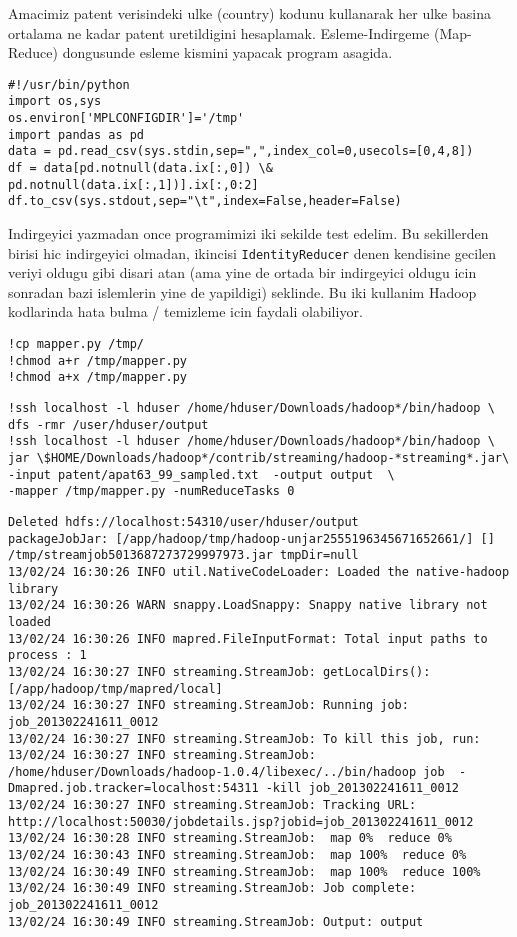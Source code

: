 \documentclass[12pt,fleqn]{article}\usepackage{../common}
\begin{document}
Amacimiz patent verisindeki ulke (country) kodunu kullanarak her ulke
basina ortalama ne kadar patent uretildigini
hesaplamak. Esleme-Indirgeme (Map-Reduce) dongusunde esleme kismini
yapacak program asagida.

\begin{verbatim}
#!/usr/bin/python
import os,sys
os.environ['MPLCONFIGDIR']='/tmp' 
import pandas as pd
data = pd.read_csv(sys.stdin,sep=",",index_col=0,usecols=[0,4,8])
df = data[pd.notnull(data.ix[:,0]) \& pd.notnull(data.ix[:,1])].ix[:,0:2]
df.to_csv(sys.stdout,sep="\t",index=False,header=False)
\end{verbatim}

Indirgeyici yazmadan once programimizi iki sekilde test edelim. Bu
sekillerden birisi hic indirgeyici olmadan, ikincisi
\verb!IdentityReducer! denen kendisine gecilen veriyi oldugu
gibi disari atan (ama yine de ortada bir indirgeyici oldugu icin
sonradan bazi islemlerin yine de yapildigi) seklinde. Bu iki kullanim
Hadoop kodlarinda hata bulma / temizleme icin faydali olabiliyor.

\begin{verbatim}
!cp mapper.py /tmp/
!chmod a+r /tmp/mapper.py
!chmod a+x /tmp/mapper.py
\end{verbatim}

\begin{verbatim}
!ssh localhost -l hduser /home/hduser/Downloads/hadoop*/bin/hadoop \
dfs -rmr /user/hduser/output
!ssh localhost -l hduser /home/hduser/Downloads/hadoop*/bin/hadoop \
jar \$HOME/Downloads/hadoop*/contrib/streaming/hadoop-*streaming*.jar\
-input patent/apat63_99_sampled.txt  -output output  \
-mapper /tmp/mapper.py -numReduceTasks 0 
\end{verbatim}

\begin{verbatim}
Deleted hdfs://localhost:54310/user/hduser/output
packageJobJar: [/app/hadoop/tmp/hadoop-unjar2555196345671652661/] [] /tmp/streamjob5013687273729997973.jar tmpDir=null
13/02/24 16:30:26 INFO util.NativeCodeLoader: Loaded the native-hadoop library
13/02/24 16:30:26 WARN snappy.LoadSnappy: Snappy native library not loaded
13/02/24 16:30:26 INFO mapred.FileInputFormat: Total input paths to process : 1
13/02/24 16:30:27 INFO streaming.StreamJob: getLocalDirs(): [/app/hadoop/tmp/mapred/local]
13/02/24 16:30:27 INFO streaming.StreamJob: Running job: job_201302241611_0012
13/02/24 16:30:27 INFO streaming.StreamJob: To kill this job, run:
13/02/24 16:30:27 INFO streaming.StreamJob: /home/hduser/Downloads/hadoop-1.0.4/libexec/../bin/hadoop job  -Dmapred.job.tracker=localhost:54311 -kill job_201302241611_0012
13/02/24 16:30:27 INFO streaming.StreamJob: Tracking URL: http://localhost:50030/jobdetails.jsp?jobid=job_201302241611_0012
13/02/24 16:30:28 INFO streaming.StreamJob:  map 0%  reduce 0%
13/02/24 16:30:43 INFO streaming.StreamJob:  map 100%  reduce 0%
13/02/24 16:30:49 INFO streaming.StreamJob:  map 100%  reduce 100%
13/02/24 16:30:49 INFO streaming.StreamJob: Job complete: job_201302241611_0012
13/02/24 16:30:49 INFO streaming.StreamJob: Output: output
\end{verbatim}
\end{document}
